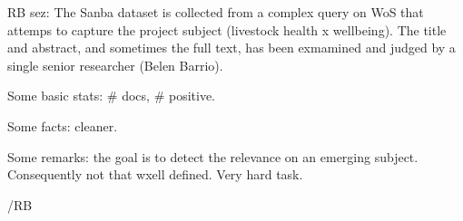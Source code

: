 \label{04_sanba_dataset}


RB sez:
The Sanba dataset is collected from a complex query on WoS that attemps to capture the project subject (livestock health x wellbeing). The title and abstract, and sometimes the full text, has been exmamined and judged by a single senior researcher (Belen Barrio).

Some basic stats: # docs, # positive.

Some facts: cleaner.

Some remarks: the goal is to detect the relevance on an emerging subject. Consequently not that wxell defined. Very hard task.

/RB























\clearpage